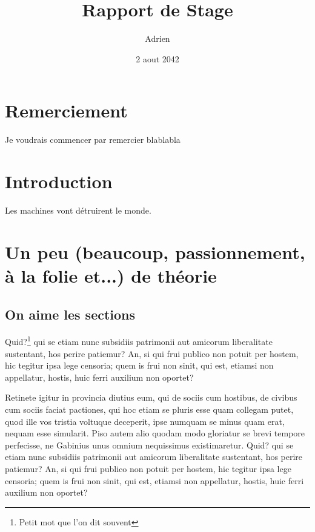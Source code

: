 \documentclass{report}
\title{Rapport de Stage}
\author{Adrien \bsc{Sanchez}}
\date{2 aout 2042}
\begin{document}
\pagestyle{fancy}

\renewcommand{\headheight}{13pt}
\lhead{\thechapter }
\chead{}
\rhead{\leftmark }
\lfoot{}
\cfoot{\thepage }


\maketitle

\chapter*{Remerciement}
Je voudrais commencer par remercier blablabla

\renewcommand{\contentsname}{Sommaire}
\setcounter{tocdepth}{1}
\tableofcontents

\listoffigures

\chapter*{Introduction}
Les machines vont détruirent le monde.

\chapter[ Un peu de théorie]{Un peu (beaucoup, passionnement, à la folie et...) de théorie}

\section{On aime les sections}

Quid?\footnote{Petit mot que l'on dit souvent} qui se etiam nunc subsidiis patrimonii aut amicorum liberalitate sustentant,
hos perire patiemur?\cite{ref} An, si\cite{ref2} qui frui publico\cite{ref3} non potuit per hostem, hic tegitur ipsa\cite{ref4}
lege censoria; quem is frui\cite{ref5} non sinit, qui est, etiamsi non appellatur, hostis, huic
ferri auxilium non oportet?\cite{ref6}
\label{clé1}

Retinete igitur in provincia diutius eum, qui de sociis
cum hostibus, de civibus cum sociis faciat pactiones, qui hoc etiam se pluris esse
quam collegam putet, quod ille vos tristia voltuque deceperit, ipse numquam se minus
quam erat, nequam esse simularit. Piso autem alio quodam modo gloriatur se brevi
tempore perfecisse,
ne Gabinius unus omnium nequissimus existimaretur.
Quid? qui se etiam nunc subsidiis patrimonii aut amicorum liberalitate sustentant,
hos perire patiemur? An, si qui frui publico non potuit per hostem, hic tegitur ipsa
lege censoria; quem is frui non sinit, qui est, etiamsi non appellatur, hostis, huic
ferri auxilium non oportet?
\end{document}
